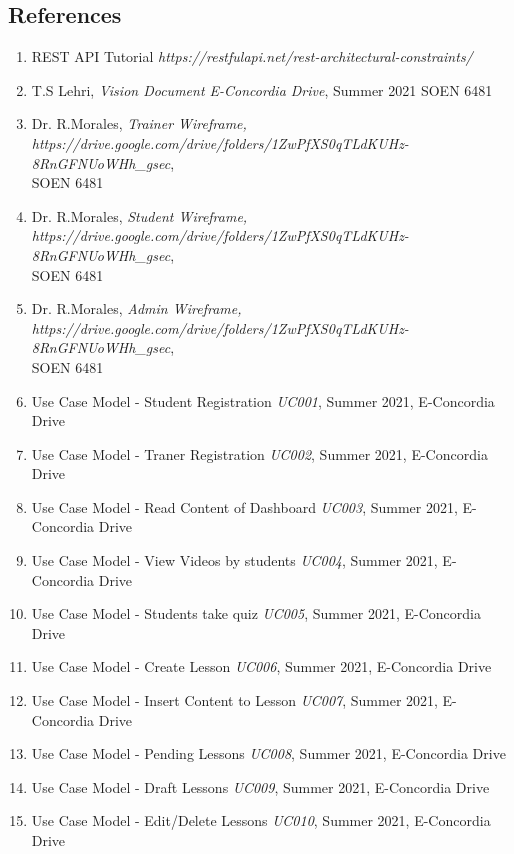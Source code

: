 \documentclass{article}
\begin{document}
\subsection{ References}
\begin{enumerate}
    \item {\footnotesize REST API Tutorial \textit{https://restfulapi.net/rest-architectural-constraints/}}
    \item {\footnotesize T.S Lehri, \textit{Vision Document E-Concordia Drive}, Summer 2021 SOEN 6481}
    \item {\footnotesize Dr. R.Morales, \textit{Trainer Wireframe, https://drive.google.com/drive/folders/1ZwPfXS0qTLdKUHz-8RnGFNUoWHh_gsec},\\SOEN 6481}
    \item {\footnotesize Dr. R.Morales, \textit{Student Wireframe, https://drive.google.com/drive/folders/1ZwPfXS0qTLdKUHz-8RnGFNUoWHh_gsec},\\SOEN 6481}
    \item {\footnotesize Dr. R.Morales, \textit{Admin Wireframe, https://drive.google.com/drive/folders/1ZwPfXS0qTLdKUHz-8RnGFNUoWHh_gsec},\\SOEN 6481}
    \item {\footnotesize Use Case Model - Student Registration \textit{UC001}, Summer 2021, E-Concordia Drive}
    \item {\footnotesize Use Case Model - Traner Registration \textit{UC002}, Summer 2021, E-Concordia Drive}
    \item {\footnotesize Use Case Model - Read Content of Dashboard \textit{UC003}, Summer 2021, E-Concordia Drive}
    \item {\footnotesize Use Case Model - View Videos by students \textit{UC004}, Summer 2021, E-Concordia Drive}
    \item {\footnotesize Use Case Model - Students take quiz \textit{UC005}, Summer 2021, E-Concordia Drive}
    \item {\footnotesize Use Case Model - Create Lesson \textit{UC006}, Summer 2021, E-Concordia Drive}
    \item {\footnotesize Use Case Model - Insert Content to Lesson \textit{UC007}, Summer 2021, E-Concordia Drive}
    \item {\footnotesize Use Case Model - Pending Lessons \textit{UC008}, Summer 2021, E-Concordia Drive}
    \item {\footnotesize Use Case Model - Draft Lessons \textit{UC009}, Summer 2021, E-Concordia Drive}
    \item {\footnotesize Use Case Model - Edit/Delete Lessons \textit{UC010}, Summer 2021, E-Concordia Drive}

\end{enumerate}
\end{document}
